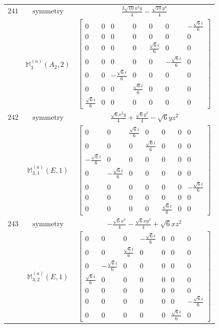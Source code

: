 \documentclass[fleqn,8pt,landscape]{jsarticle}
\begin{document}
\begin{longtable}{ccc}
$ 241 $ & $ \text{symmetry} $ & $ \frac{3 \sqrt{10} x^{2} y}{4} - \frac{\sqrt{10} y^{3}}{4} $ \\
$  $ & $ \mathbb{M}_{3}^{(a)}(A_{2},2) $ & $ \begin{bmatrix} 0 & 0 & 0 & 0 & 0 & 0 & - \frac{\sqrt{6} i}{6} \\ 0 & 0 & 0 & 0 & 0 & 0 & 0 \\ 0 & 0 & 0 & 0 & \frac{\sqrt{6} i}{6} & 0 & 0 \\ 0 & 0 & 0 & 0 & 0 & - \frac{\sqrt{6} i}{6} & 0 \\ 0 & 0 & - \frac{\sqrt{6} i}{6} & 0 & 0 & 0 & 0 \\ 0 & 0 & 0 & \frac{\sqrt{6} i}{6} & 0 & 0 & 0 \\ \frac{\sqrt{6} i}{6} & 0 & 0 & 0 & 0 & 0 & 0 \end{bmatrix} $ \\ \hline
$ 242 $ & $ \text{symmetry} $ & $ \frac{\sqrt{6} x^{2} y}{4} + \frac{\sqrt{6} y^{3}}{4} - \sqrt{6} y z^{2} $ \\
$  $ & $ \mathbb{M}_{3,1}^{(a)}(E,1) $ & $ \begin{bmatrix} 0 & 0 & \frac{\sqrt{6} i}{6} & 0 & 0 & 0 & 0 \\ 0 & 0 & 0 & \frac{\sqrt{6} i}{6} & 0 & 0 & 0 \\ - \frac{\sqrt{6} i}{6} & 0 & 0 & 0 & 0 & 0 & 0 \\ 0 & - \frac{\sqrt{6} i}{6} & 0 & 0 & 0 & 0 & 0 \\ 0 & 0 & 0 & 0 & 0 & 0 & - \frac{\sqrt{6} i}{6} \\ 0 & 0 & 0 & 0 & 0 & 0 & 0 \\ 0 & 0 & 0 & 0 & \frac{\sqrt{6} i}{6} & 0 & 0 \end{bmatrix} $ \\ \hline
$ 243 $ & $ \text{symmetry} $ & $ - \frac{\sqrt{6} x^{3}}{4} - \frac{\sqrt{6} x y^{2}}{4} + \sqrt{6} x z^{2} $ \\
$  $ & $ \mathbb{M}_{3,2}^{(a)}(E,1) $ & $ \begin{bmatrix} 0 & 0 & 0 & - \frac{\sqrt{6} i}{6} & 0 & 0 & 0 \\ 0 & 0 & \frac{\sqrt{6} i}{6} & 0 & 0 & 0 & 0 \\ 0 & - \frac{\sqrt{6} i}{6} & 0 & 0 & 0 & 0 & 0 \\ \frac{\sqrt{6} i}{6} & 0 & 0 & 0 & 0 & 0 & 0 \\ 0 & 0 & 0 & 0 & 0 & 0 & 0 \\ 0 & 0 & 0 & 0 & 0 & 0 & - \frac{\sqrt{6} i}{6} \\ 0 & 0 & 0 & 0 & 0 & \frac{\sqrt{6} i}{6} & 0 \end{bmatrix} $ \\ \hline

\end{longtable}
\end{document}
